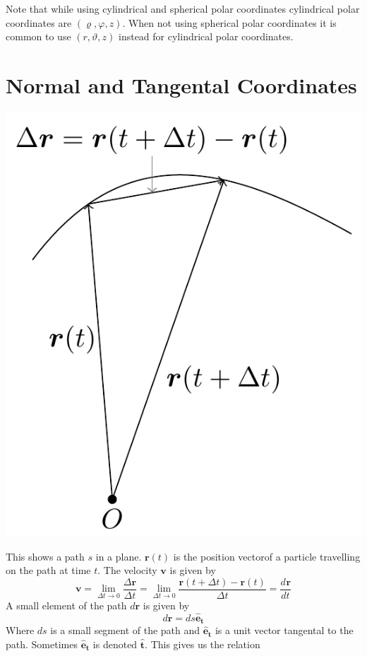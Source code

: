\documentclass{article}
\newcommand{\vh}[1]{\vec{\hat{#1}}}
\renewcommand{\vec}[1]{\bm{#1}}
\newcommand{\vv}[1]{\vec{#1}}
\newcommand{\ve}[1]{\vec{\hat{e}_{#1}}}
\newcommand{\dv}[3][]{\frac{d^{#1}{#2}}{d{#3}^{#1}}}
\begin{document}
Note that while using cylindrical and spherical polar coordinates cylindrical polar coordinates are \((\varrho,\varphi,z)\). When not using spherical polar coordinates it is common to use \((r,\vartheta,z)\) instead for cylindrical polar coordinates.

\section{Normal and Tangental Coordinates}

\begin{center}
\includegraphics[scale=0.3]{PositionVectors}
\end{center}
This shows a path \(s\) in a plane. \(\vv r(t)\) is the position vectorof a particle travelling on the path at time \(t\). The velocity \(\vv v\) is given by
\[\vv v=\lim_{\Delta t\to0}\frac{\Delta\vv r}{\Delta t}=\lim_{\Delta t\to0}\frac{\vv r(t+\Delta t)-\vv r(t)}{\Delta t}=\dv{\vv r}{t}\]
A small element of the path \(d\vv r\) is given by
\[d\vv r=ds\ve t\]
Where \(ds\) is a small segment of the path and \(\ve t\) is a unit vector tangental to the path. Sometimes \(\ve t\) is denoted \(\vh t\). This gives us the relation
\end{document}
